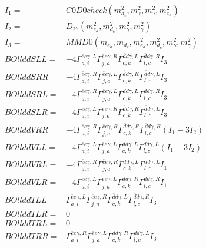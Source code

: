 \documentclass[A4,landscape]{article}
\begin{document}
\begin{align} 
I_1 = & C0D0check(m^2_{d_{{c}}}, m^2_{\gamma}, m^2_{\gamma}, m^2_{e_{{a}}}) \\ 
I_2 = & D_{27}(m^2_{e_{{a}}}, m^2_{d_{{c}}}, m^2_{\gamma}, m^2_{\gamma}) \\ 
I_3 = & MMD0(m_{e_{{a}}}, m_{d_{{c}}}, m^2_{e_{{a}}}, m^2_{d_{{c}}}, m^2_{\gamma}, m^2_{\gamma}) \\ 
  BOllddSLL= & -4  \Gamma^{\bar{e}e \gamma ,L}_{a, i} \Gamma^{\bar{e}e \gamma ,R}_{j, a} \Gamma^{\bar{d}d \gamma ,L}_{c, k} \Gamma^{\bar{d}d \gamma ,R}_{l, c} I_3 \\ 
  BOllddSRR= & -4  \Gamma^{\bar{e}e \gamma ,R}_{a, i} \Gamma^{\bar{e}e \gamma ,L}_{j, a} \Gamma^{\bar{d}d \gamma ,R}_{c, k} \Gamma^{\bar{d}d \gamma ,L}_{l, c} I_3 \\ 
  BOllddSRL= & -4  \Gamma^{\bar{e}e \gamma ,R}_{a, i} \Gamma^{\bar{e}e \gamma ,L}_{j, a} \Gamma^{\bar{d}d \gamma ,L}_{c, k} \Gamma^{\bar{d}d \gamma ,R}_{l, c} I_3 \\ 
  BOllddSLR= & -4  \Gamma^{\bar{e}e \gamma ,L}_{a, i} \Gamma^{\bar{e}e \gamma ,R}_{j, a} \Gamma^{\bar{d}d \gamma ,R}_{c, k} \Gamma^{\bar{d}d \gamma ,L}_{l, c} I_3 \\ 
  BOllddVRR= & -4  \Gamma^{\bar{e}e \gamma ,R}_{a, i} \Gamma^{\bar{e}e \gamma ,R}_{j, a} \Gamma^{\bar{d}d \gamma ,R}_{c, k} \Gamma^{\bar{d}d \gamma ,R}_{l, c} (I_1 - 3 I_2) \\ 
  BOllddVLL= & -4  \Gamma^{\bar{e}e \gamma ,L}_{a, i} \Gamma^{\bar{e}e \gamma ,L}_{j, a} \Gamma^{\bar{d}d \gamma ,L}_{c, k} \Gamma^{\bar{d}d \gamma ,L}_{l, c} (I_1 - 3 I_2) \\ 
  BOllddVRL= & -4  \Gamma^{\bar{e}e \gamma ,R}_{a, i} \Gamma^{\bar{e}e \gamma ,R}_{j, a} \Gamma^{\bar{d}d \gamma ,L}_{c, k} \Gamma^{\bar{d}d \gamma ,L}_{l, c} I_1 \\ 
  BOllddVLR= & -4  \Gamma^{\bar{e}e \gamma ,L}_{a, i} \Gamma^{\bar{e}e \gamma ,L}_{j, a} \Gamma^{\bar{d}d \gamma ,R}_{c, k} \Gamma^{\bar{d}d \gamma ,R}_{l, c} I_1 \\ 
  BOllddTLL= &  \Gamma^{\bar{e}e \gamma ,L}_{a, i} \Gamma^{\bar{e}e \gamma ,R}_{j, a} \Gamma^{\bar{d}d \gamma ,L}_{c, k} \Gamma^{\bar{d}d \gamma ,R}_{l, c} I_3 \\ 
  BOllddTLR= & 0 \\ 
  BOllddTRL= & 0 \\ 
  BOllddTRR= &  \Gamma^{\bar{e}e \gamma ,R}_{a, i} \Gamma^{\bar{e}e \gamma ,L}_{j, a} \Gamma^{\bar{d}d \gamma ,R}_{c, k} \Gamma^{\bar{d}d \gamma ,L}_{l, c} I_3 \\ 
\end{align} 
\end{document}
